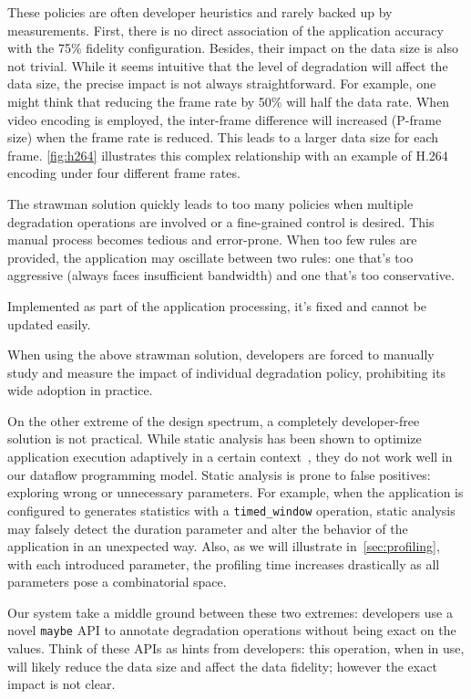  These policies are often developer heuristics and
rarely backed up by measurements. First, there is no direct association of the
application accuracy with the 75\% fidelity configuration. Besides, their impact
on the data size is also not trivial.  While it seems intuitive that the level
of degradation will affect the data size, the precise impact is not always
straightforward. For example, one might think that reducing the frame rate by
50\% will half the data rate. When video encoding is employed, the inter-frame
difference will increased (P-frame size) when the frame rate is reduced. This
leads to a larger data size for each frame. \autoref{fig:h264} illustrates this
complex relationship with an example of H.264 encoding under four different
frame rates.

 The strawman solution quickly leads to too many policies
when multiple degradation operations are involved or a fine-grained control is
desired. This manual process becomes tedious and error-prone. When too few rules
are provided, the application may oscillate between two rules: one that's too
aggressive (always faces insufficient bandwidth) and one that's too
conservative.

 Implemented as part of the application processing, it's fixed and
cannot be updated easily.

When using the above strawman solution, developers are forced to manually study
and measure the impact of individual degradation policy, prohibiting its wide
adoption in practice.

On the other extreme of the design spectrum, a completely developer-free
solution is not practical. While static analysis has been shown to optimize
application execution adaptively in a certain context~\cite{chun2011clonecloud},
they do not work well in our dataflow programming model. Static analysis is
prone to false positives: exploring wrong or unnecessary parameters. For
example, when the application is configured to generates statistics with a
\texttt{timed\_window} operation, static analysis may falsely detect the
duration parameter and alter the behavior of the application in an unexpected
way. Also, as we will illustrate in~\autoref{sec:profiling}, with each
introduced parameter, the profiling time increases drastically as all parameters
pose a combinatorial space.

Our system take a middle ground between these two extremes: developers use a
novel \texttt{maybe} API to annotate degradation operations without being exact
on the values. Think of these APIs as hints from developers: this operation,
when in use, will likely reduce the data size and affect the data fidelity;
however the exact impact is not clear.

